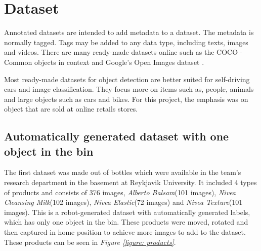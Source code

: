 \section{Dataset}
Annotated datasets are intended to add metadata to a dataset. The metadata is normally tagged. Tags may be added to any data type, including texts, images and videos. There are many ready-made datasets online such as the COCO - Common objects in context \cite{noauthor_coco_nodate} and Google’s Open Images dataset \cite{noauthor_open_nodate}.

Most ready-made datasets for object detection are better suited for self-driving cars and image classification. They focus more on items such as, people, animals and large objects such as cars and bikes. For this project, the emphasis was on object that are sold at online retails stores.

\subsection{Automatically generated dataset with one object in the bin} \label{sec:firstdataset}
The first dataset was made out of bottles which were available in the team’s research department in the basement at Reykjavik University. It included 4 types of products and consists of 376 images, \textit{Alberto Balsam}(101 images), \textit{Nivea Cleansing Milk}(102 images), \textit{Nivea Elastic}(72 images) and \textit{Nivea Texture}(101 images). 
This is a robot-generated dataset with automatically generated labels, which has only one object in the bin. 
These products were moved, rotated and then captured in home position to achieve more images to add to the dataset. 
These products can be seen in \textit{Figure \ref{figure: products}}.

